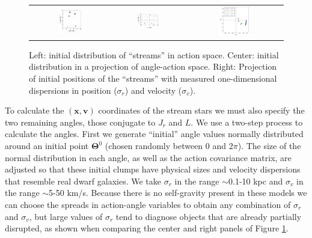 \documentclass{emulateapj}
\begin{document}
\begin{figure}
 \begin{tabular}{ccc}
\includegraphics[width=0.32\textwidth]{Figures/InitialActions} & \includegraphics[width=0.32\textwidth]{Figures/InitialJrTheta5} & \includegraphics[width=0.32\textwidth]{Figures/InitXZ5}
\end{tabular}
\caption{Left: initial distribution of ``streams'' in action space. Center: initial distribution in a projection of angle-action space. Right: Projection of initial positions of the ``streams'' with measured one-dimensional dispersions in position ($\sigma_r$) and velocity ($\sigma_v$). }
\label{fig:initSetup}
\end{figure}


To calculate the $(\mathbf{x},\mathbf{v})$ coordinates of the stream stars we must also specify the two remaining angles, those conjugate to $J_r$ and $L$. We use a two-step process to calculate the angles. First we generate ``initial'' angle values normally distributed around an initial point $\mathbf{\Theta}^0$ (chosen randomly between 0 and $2\pi$). The size of the normal distribution in each angle, as well as the action covariance matrix, are adjusted so that these initial clumps have physical sizes and velocity dispersions that resemble real dwarf galaxies. We take $\sigma_r$ in the range $\sim$0.1-10 kpc and $\sigma_v$ in the range $\sim$5-50 km/s. Because there is no self-gravity present in these models we can choose the spreads in action-angle variables to obtain any combination of $\sigma_r$ and $\sigma_v$, but large values of $\sigma_r$ tend to diagnose objects that are already partially disrupted, as shown when comparing the center and right panels of Figure \ref{fig:initSetup}.
\end{document}

